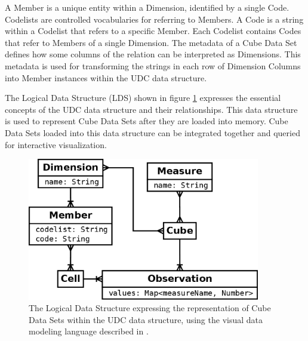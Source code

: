 A Member is a unique entity within a Dimension, identified by a single Code. Codelists are controlled vocabularies for referring to Members. A Code is a string within a Codelist that refers to a specific Member. Each Codelist contains Codes that refer to Members of a single Dimension. The metadata of a Cube Data Set defines how some columns of the relation can be interpreted as Dimensions. This metadata is used for transforming the strings in each row of Dimension Columns into Member instances within the UDC data structure.

The Logical Data Structure (LDS) shown in figure \ref{fig_lds} expresses the essential concepts of the UDC data structure and their relationships. This data structure is used to represent Cube Data Sets after they are loaded into memory. Cube Data Sets loaded into this data structure can be integrated together and queried for interactive visualization.
%
%
%
\begin{figure}
  \centering
  \includegraphics[width=4in]{figs/lds.png}
  \caption [UDC Logical Data Structure]{The Logical Data Structure expressing the representation of Cube Data Sets within the UDC data structure, using the visual data modeling language described in \cite{carlis2000mastering}.}
  \label{fig_lds}
\end{figure}

